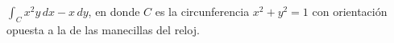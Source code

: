 \item $\int_C x^2y \, dx - x \, dy$, en donde $C$ es la circunferencia $x^2 + y^2 = 1$ con orientación opuesta a la de las manecillas del reloj.
